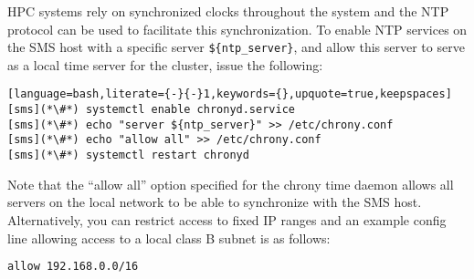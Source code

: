 HPC systems rely on synchronized clocks throughout the system and the
NTP protocol can be used to facilitate this synchronization. To enable NTP
services on the SMS host with a specific server \texttt{\$\{ntp\_server\}}, and
allow this server to serve as a local time server for the cluster, 
issue the following:

\begin{lstlisting}[language=bash,literate={-}{-}1,keywords={},upquote=true,keepspaces]
[sms](*\#*) systemctl enable chronyd.service
[sms](*\#*) echo "server ${ntp_server}" >> /etc/chrony.conf
[sms](*\#*) echo "allow all" >> /etc/chrony.conf
[sms](*\#*) systemctl restart chronyd
\end{lstlisting}

\begin{center}
\begin{tcolorbox}[]
\small Note that the ``allow all'' option specified for the chrony time daemon
allows all servers on the local network to be able to synchronize with the SMS
host. Alternatively, you can restrict access to fixed IP ranges and an example
config line allowing access to a local class B subnet is as follows:
\begin{lstlisting}[language=bash]
allow 192.168.0.0/16
\end{lstlisting}
\end{tcolorbox}
\end{center}
